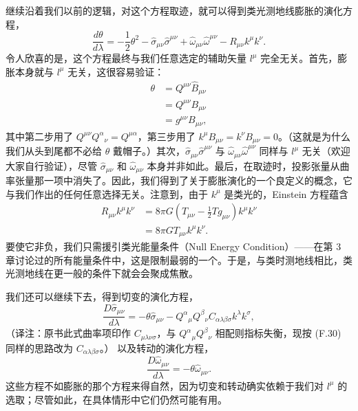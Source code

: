 继续沿着我们以前的逻辑，对这个方程取迹，就可以得到类光测地线膨胀的演化方程，
\begin{equation*}
\frac{d\theta}{d\lambda} = -\frac{1}{2}\theta^2 - \widehat{\sigma}_{\mu\nu}\widehat{\sigma}^{\mu\nu} + \widehat{\omega}_{\mu\nu}\widehat{\omega}^{\mu\nu} - R_{\mu\nu}k^\mu k^\nu.
\tag{F.31}
\end{equation*}
令人欣喜的是，这个方程最终与我们任意选定的辅助矢量 $l^\mu$ 完全无关。首先，膨胀本身就与 $l^\mu$ 无关，这很容易验证：
\begin{align*}
\theta &= Q^{\mu\nu}\widehat{B}_{\mu\nu} \\
&= Q^{\mu\nu}B_{\mu\nu} \\
&= g^{\mu\nu}B_{\mu\nu},
\tag{F.32}
\end{align*}
其中第二步用了 $Q^{\mu\nu}Q^\alpha{}_\nu = Q^{\mu\alpha}$，第三步用了 $k^\mu B_{\mu\nu} = k^\nu B_{\mu\nu} = 0$。（这就是为什么我们从头到尾都不必给 $\theta$ 戴帽子。）其次，$\widehat{\sigma}_{\mu\nu}\widehat{\sigma}^{\mu\nu}$ 与 $\widehat{\omega}_{\mu\nu}\widehat{\omega}^{\mu\nu}$ 同样与 $l^\mu$ 无关（欢迎大家自行验证），尽管 $\widehat{\sigma}_{\mu\nu}$ 和 $\widehat{\omega}_{\mu\nu}$ 本身并非如此。最后，在取迹时，投影张量从曲率张量那一项中消失了。因此，我们得到了关于膨胀演化的一个良定义的概念，它与我们作出的任何任意选择无关。注意到，由于 $k^\mu$ 是类光的，Einstein 方程蕴含
\begin{align*}
R_{\mu\nu}k^\mu k^\nu &= 8\pi G\left(T_{\mu\nu} - \frac{1}{2}Tg_{\mu\nu}\right)k^\mu k^\nu \\
&= 8\pi G T_{\mu\nu}k^\mu k^\nu.
\tag{F.33}
\end{align*}
要使它非负，我们只需援引类光能量条件（Null Energy Condition）——在第 3 章讨论过的所有能量条件中，这是限制最弱的一个。于是，与类时测地线相比，类光测地线在更一般的条件下就会会聚成焦散。

我们还可以继续下去，得到切变的演化方程，
\begin{equation*}
\frac{D\widehat{\sigma}_{\mu\nu}}{d\lambda} = -\theta\widehat{\sigma}_{\mu\nu} - Q^\alpha{}_\mu Q^\beta{}_\nu C_{\alpha\lambda\beta\sigma}k^\lambda k^\sigma,
\tag{F.34}
\end{equation*}
（译注：原书此式曲率项印作 $C_{\mu\lambda\nu\sigma}$，与 $Q^\alpha{}_\mu Q^\beta{}_\nu$ 相配则指标失衡，现按 (F.30) 同样的思路改为 $C_{\alpha\lambda\beta\sigma}$。）
以及转动的演化方程，
\begin{equation*}
\frac{D\widehat{\omega}_{\mu\nu}}{d\lambda} = -\theta\widehat{\omega}_{\mu\nu}.
\tag{F.35}
\end{equation*}
这些方程不如膨胀的那个方程来得自然，因为切变和转动确实依赖于我们对 $l^\mu$ 的选取；尽管如此，在具体情形中它们仍然可能有用。

